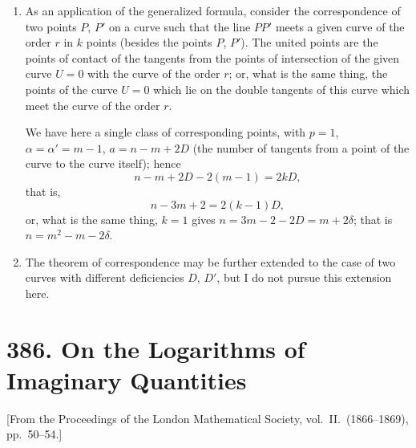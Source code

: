 \documentclass[12pt,a4paper]{article}
\theoremstyle{plain}
\theoremstyle{definition}
\theoremstyle{remark}
\begin{document}
\begin{enumerate}[label=\arabic*.]
The theorem then is
\[p(a - \alpha - \alpha') + q(b - \beta - \beta') + \cdots = 0,\]
or, as this may also be written,
\[pa + qb + \cdots = p(\alpha + \alpha') + q(\beta + \beta') + \cdots + 2(p\alpha + q\beta + \cdots)D,\]
where $p\alpha + q\beta + \cdots = k$ (a positive integer).

\item As an application of the generalized formula, consider the correspondence of two points $P$, $P'$ on a curve such that the line $PP'$ meets a given curve of the order $r$ in $k$ points (besides the points $P$, $P'$). The united points are the points of contact of the tangents from the points of intersection of the given curve $U = 0$ with the curve of the order $r$; or, what is the same thing, the points of the curve $U = 0$ which lie on the double tangents of this curve which meet the curve of the order $r$.

We have here a single class of corresponding points, with $p = 1$, $\alpha = \alpha' = m - 1$, $a = n - m + 2D$ (the number of tangents from a point of the curve to the curve itself); hence
\[n - m + 2D - 2(m-1) = 2kD,\]
that is,
\[n - 3m + 2 = 2(k-1)D,\]
or, what is the same thing, $k = 1$ gives $n = 3m - 2 - 2D = m + 2\delta$; that is $n = m^2 - m - 2\delta$.

\item[$10$.] The theorem of correspondence may be further extended to the case of two curves with different deficiencies $D$, $D'$, but I do not pursue this extension here.
\end{enumerate}



\section*{386. On the Logarithms of Imaginary Quantities}

\begin{center}
\small [From the Proceedings of the London Mathematical Society, vol.~II.\ (1866--1869), pp.~50--54.]
\end{center}
\end{document}

